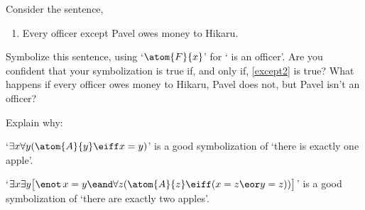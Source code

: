 \practiceproblems


\problempart 
Consider the sentence,
\begin{enumerate}
	\item\label{except2} Every officer except Pavel owes money to Hikaru.
\end{enumerate}
Symbolize this sentence, using `$\atom{F}{x}$' for ` is an officer'.  Are you confident that your symbolization is true if, and only if, \cref*{except2} is true?  What happens if every officer owes money to Hikaru, Pavel does not, but Pavel isn't an officer?

\problempart 
Explain why:
	\begin{compactlist}
		\item `$\exists x \forall y(\atom{A}{y} \eiff x= y)$' is a good
		symbolization of `there is exactly one apple'.
		\item `$\exists x \exists y \bigl[\enot\, {x = y} \eand \forall
		z(\atom{A}{z} \eiff (x= z \eor y = z))\bigr]$' is a good
		symbolization of `there are exactly two apples'.
	\end{compactlist}


